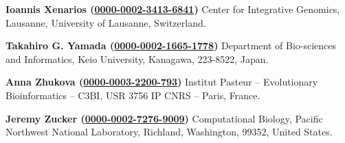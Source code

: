 \documentclass{sbml-paper}
\newcommand{\orcid}[1]{\href{https://orcid.org/#1}{#1}}
\begin{document}
\textbf{Ioannis Xenarios (\orcid{0000-0002-3413-6841})} Center for Integrative Genomics, Lausanne, University of Lausanne, Switzerland.

\textbf{Takahiro G. Yamada (\orcid{0000-0002-1665-1778})} Department of Bio-sciences and Informatics, Keio University, Kanagawa, 223-8522, Japan.

\textbf{Anna Zhukova (\orcid{0000-0003-2200-793})} Institut Pasteur – Evolutionary Bioinformatics – C3BI, USR 3756 IP CNRS – Paris, France.

\textbf{Jeremy Zucker (\orcid{0000-0002-7276-9009})} Computational Biology, Pacific Northwest National Laboratory, Richland, Washington, 99352, United States.
\end{document}
